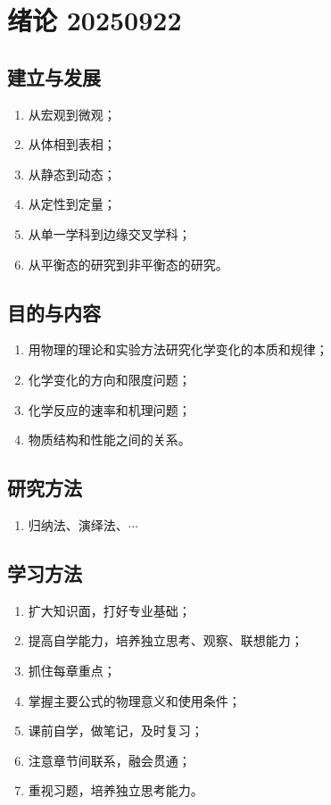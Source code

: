 \section{绪论 20250922}

\subsection{建立与发展}

\begin{enumerate}
    \item 从宏观到微观；
    \item 从体相到表相；
    \item 从静态到动态；
    \item 从定性到定量；
    \item 从单一学科到边缘交叉学科；
    \item 从平衡态的研究到非平衡态的研究。
\end{enumerate}

\subsection{目的与内容}

\begin{enumerate}
    \item 用物理的理论和实验方法研究化学变化的本质和规律；
    \item 化学变化的方向和限度问题；
    \item 化学反应的速率和机理问题；
    \item 物质结构和性能之间的关系。
\end{enumerate}

\subsection{研究方法}

\begin{enumerate}
    \item 归纳法、演绎法、$\cdots$
\end{enumerate}

\subsection{学习方法}

\begin{enumerate}
    \item 扩大知识面，打好专业基础；
    \item 提高自学能力，培养独立思考、观察、联想能力；
    \item 抓住每章重点；
    \item 掌握主要公式的物理意义和使用条件；
    \item 课前自学，做笔记，及时复习；
    \item 注意章节间联系，融会贯通；
    \item 重视习题，培养独立思考能力。
\end{enumerate}
